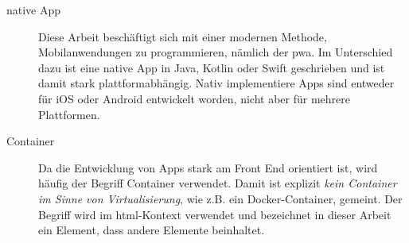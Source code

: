 \begin{description}
	\item [native App]
		Diese Arbeit beschäftigt sich mit einer modernen Methode, Mobilanwendungen zu programmieren, nämlich der \ac{pwa}. Im Unterschied dazu ist eine native App in Java, Kotlin oder Swift geschrieben und ist damit stark plattformabhängig. Nativ implementiere Apps sind entweder für iOS oder Android entwickelt worden, nicht aber für mehrere Plattformen.
		
	\item [Container]
		Da die Entwicklung von Apps stark am Front End orientiert ist, wird häufig der Begriff Container verwendet. Damit ist explizit \textit{kein Container im Sinne von Virtualisierung}, wie z.B. ein Docker-Container, gemeint. Der Begriff wird im \ac{html}-Kontext verwendet und bezeichnet in dieser Arbeit ein Element, dass andere Elemente beinhaltet.
	
\end{description}
